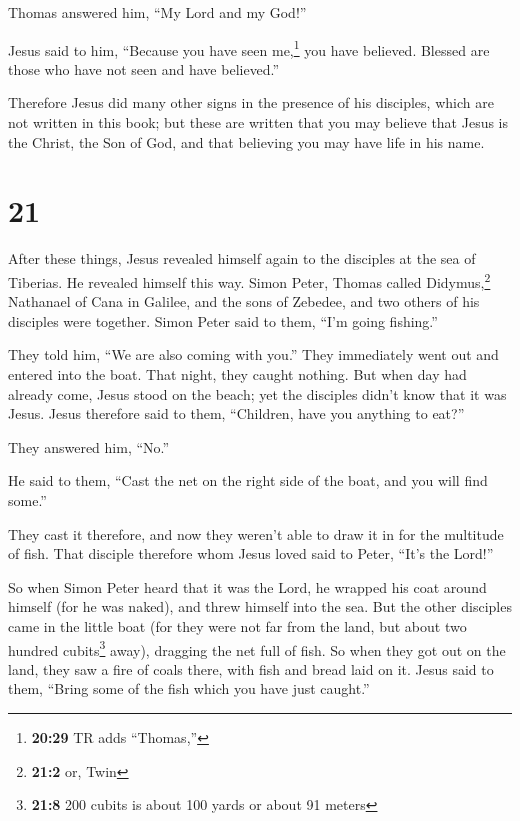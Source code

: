  Thomas answered him, ``My Lord and my God!''

 Jesus said to him, ``Because you have seen
me,\footnote{\textbf{20:29} TR adds ``Thomas,''} you have believed.
Blessed are those who have not seen and have believed.''

 Therefore Jesus did many other signs in the presence of
his disciples, which are not written in this book;  but
these are written that you may believe that Jesus is the Christ, the Son
of God, and that believing you may have life in his name.

\hypertarget{section-20}{%
\section{21}\label{section-20}}

 After these things, Jesus revealed himself again to the
disciples at the sea of Tiberias. He revealed himself this way.
 Simon Peter, Thomas called Didymus,\footnote{\textbf{21:2}
  or, Twin} Nathanael of Cana in Galilee, and the sons of Zebedee, and
two others of his disciples were together.  Simon Peter
said to them, ``I'm going fishing.''

They told him, ``We are also coming with you.'' They immediately went
out and entered into the boat. That night, they caught nothing.
 But when day had already come, Jesus stood on the beach;
yet the disciples didn't know that it was Jesus.  Jesus
therefore said to them, ``Children, have you anything to eat?''

They answered him, ``No.''

 He said to them, ``Cast the net on the right side of the
boat, and you will find some.''

They cast it therefore, and now they weren't able to draw it in for the
multitude of fish.  That disciple therefore whom Jesus
loved said to Peter, ``It's the Lord!''

So when Simon Peter heard that it was the Lord, he wrapped his coat
around himself (for he was naked), and threw himself into the sea.
 But the other disciples came in the little boat (for they
were not far from the land, but about two hundred cubits\footnote{\textbf{21:8}
  200 cubits is about 100 yards or about 91 meters} away), dragging the
net full of fish.  So when they got out on the land, they
saw a fire of coals there, with fish and bread laid on it.
 Jesus said to them, ``Bring some of the fish which you
have just caught.''


